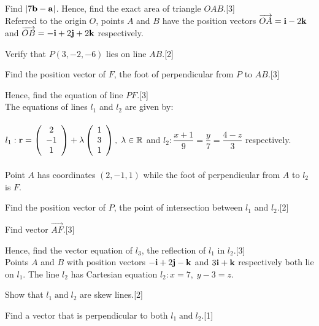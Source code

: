 \documentclass[12pt, a4 paper]{article}
\begin{document}
\begin{outline}[enumerate]
	\2 	Find $\left| {7{\bf{b}} - {\bf{a}}} \right|$. Hence, find the exact area of triangle $OAB$.\hfill[3]\\
		
	\1 Referred to the origin $O$, points $A$ and $B$ have the position vectors $\overrightarrow {OA}  = {\bf{i}} - 2{\bf{k}}$ and $\overrightarrow {OB}  =  - {\bf{i}} + 2{\bf{j}} + 2{\bf{k}}$ respectively.
		
	\2 Verify that $P(3,-2,-6)$ lies on line $AB$.\hfill[2]
		
	\2 Find the position vector of $F$, the foot of perpendicular from $P$ to $AB$.\hfill[3]
		
	\2 Hence, find the equation of line $PF$.\hfill[3]\\
		
	\1  The equations of lines ${l_1}$ and ${l_2}$ are given by:\\\\${l_1}:{\bf{r}} = \left( {\begin{array}{*{20}{c}}2\\{ - 1}\\1\end{array}} \right) + \lambda \left( {\begin{array}{*{20}{c}}1\\3\\1\end{array}} \right),\;\lambda  \in \mathbb{R}$ and ${l_2}:\dfrac{{x + 1}}{9} = \dfrac{y}{7} = \dfrac{{4 - z}}{3}$ respectively.\\\\Point $A$ has coordinates $(2, - 1,1)$ while the foot of perpendicular from $A$ to ${l_2}$ is $F$.
		
	\2 Find the position vector of $P$, the point of intersection between ${l_1}$ and ${l_2}$.\hfill[2]
		
	\2 Find vector $\overrightarrow {AF}$.\hfill[3]
		
	\2 Hence, find the vector equation of ${l_3}$, the reflection of ${l_1}$ in ${l_2}$.\hfill[3]\\
								
	\1 Points $A$ and $B$ with position vectors $ - {\bf{i}} + 2{\bf{j}} - {\bf{k}}$ and $3{\bf{i}} + {\bf{k}}$ respectively both lie on ${l_1}$. The line ${l_2}$ has Cartesian equation ${l_2}:x = 7,\;y - 3 = z$.
													
	\2 Show that ${l_1}\;{\textrm{and}}\;{l_2}$ are skew lines.\hfill[2]
	
	\2 Find a vector that is perpendicular to both ${l_1}\;{\textrm{and}}\;{l_2}$.\hfill[1]
	

\end{outline}
\end{document}
